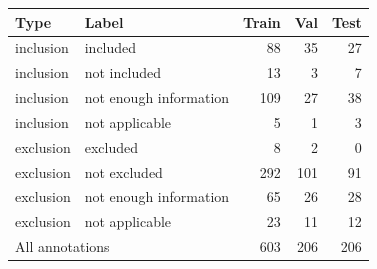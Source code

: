 \begin{tabular}{llrrr}\toprule
Type & Label & Train & Val & Test \\ \midrule
inclusion & included & 88 & 35 & 27 \\
inclusion & not included & 13 & 3 & 7 \\
inclusion & not enough information & 109 & 27 & 38 \\
inclusion & not applicable & 5 & 1 & 3 \\
exclusion & excluded & 8 & 2 & 0 \\
exclusion & not excluded & 292 & 101 & 91 \\
exclusion & not enough information & 65 & 26 & 28 \\
exclusion & not applicable & 23 & 11 & 12 \\
\midrule
\multicolumn{2}{l}{All annotations} & 603 & 206 & 206 \\
\bottomrule\end{tabular}
